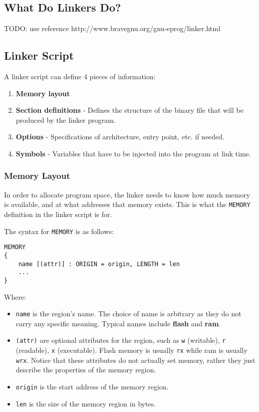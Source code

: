 \subsection{What Do Linkers Do?}
TODO: use reference http://www.bravegnu.org/gnu-eprog/linker.html

\subsection{Linker Script}
A linker script can define 4 pieces of information:
\begin{enumerate}
    \item \textbf{Memory layout}
    \item \textbf{Section definitions} - Defines the structure of the binary file that will be produced by the linker program.
    \item \textbf{Options} - Specifications of architecture, entry point, etc. if needed.
    \item \textbf{Symbols} - Variables that have to be injected into the program at link time.
\end{enumerate}\cite{memfaultLinkerScripts}

\subsubsection{Memory Layout}
In order to allocate program space, the linker needs to know how much memory is available, and at what addresses that memory exists. This is what the \verb|MEMORY| definition in the linker script is for.

The syntax for \verb|MEMORY| is as follows:
\begin{verbatim}
MEMORY
{
    name [(attr)] : ORIGIN = origin, LENGTH = len
    ...
}
\end{verbatim}
Where:
\begin{itemize}
    \item \verb|name| is the region's name. The choice of name is arbitrary as they do not carry any specific meaning. Typical names include \textbf{flash} and \textbf{ram}.
    \item \verb|(attr)| are optional attributes for the region, such as \verb|w| (writable), \verb|r| (readable), \verb|x| (executable). Flash memory is usually \verb|rx| while ram is usually \verb|wrx|. Notice that these attributes do not actually set memory, rather they just describe the properties of the memory region.
    \item \verb|origin| is the start address of the memory region.
    \item \verb|len| is the size of the memory region in bytes.
\end{itemize}

